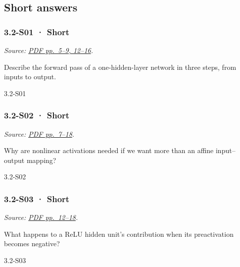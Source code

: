 \subsection{Short answers}\label{short-answers-8}

\noindent\begin{minipage}{\linewidth}

\subsubsection{3.2-S01 · Short}\label{s01-short-8}

\emph{Source:
\href{../Lecture\%20Slides/3.2.\%20Shallow\%20NN.pdf\#page=5}{PDF
pp.~5--9, 12--16}.}

Describe the forward pass of a one-hidden-layer network in three steps,
from inputs to output.

\begin{solution}[20mm]{3.2-S01}

\end{solution}
\end{minipage}\par\medskip

\noindent\begin{minipage}{\linewidth}

\subsubsection{3.2-S02 · Short}\label{s02-short-8}

\emph{Source:
\href{../Lecture\%20Slides/3.2.\%20Shallow\%20NN.pdf\#page=7}{PDF
pp.~7--18}.}

Why are nonlinear activations needed if we want more than an affine
input--output mapping?

\begin{solution}[20mm]{3.2-S02}

\end{solution}
\end{minipage}\par\medskip

\noindent\begin{minipage}{\linewidth}

\subsubsection{3.2-S03 · Short}\label{s03-short-8}

\emph{Source:
\href{../Lecture\%20Slides/3.2.\%20Shallow\%20NN.pdf\#page=12}{PDF
pp.~12--18}.}

What happens to a ReLU hidden unit's contribution when its preactivation
becomes negative?

\begin{solution}[20mm]{3.2-S03}

\end{solution}
\end{minipage}\par\medskip

